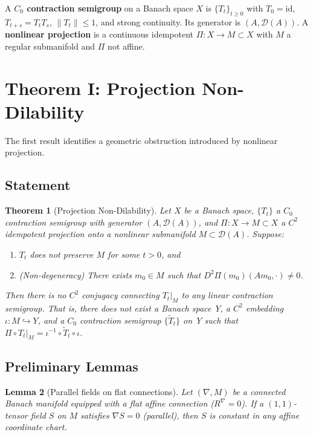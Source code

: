 \documentclass[12pt,a4paper]{amsart}
\theoremstyle{plain}
\newtheorem{theorem}{Theorem}[section]
\newtheorem{lemma}[theorem]{Lemma}
\theoremstyle{definition}
\theoremstyle{remark}
\newcommand{\id}{\mathrm{id}}
\begin{document}
A \textbf{$C_0$ contraction semigroup} on a Banach space $X$ is
$\{T_t\}_{t \geq 0}$ with $T_0 = \id$, $T_{t+s} = T_t T_s$,
$\|T_t\| \leq 1$, and strong continuity. Its generator is
$(A, \mathcal{D}(A))$. A \textbf{nonlinear projection} is a
continuous idempotent $\Pi\colon X \to M \subset X$ with $M$ a regular
submanifold and $\Pi$ not affine.



\section{Theorem I: Projection Non-Dilability}\label{sec:thm1}

The first result identifies a geometric obstruction introduced by
nonlinear projection.

\subsection{Statement}

\begin{theorem}[Projection Non-Dilability]\label{thm:nondilat}
Let $X$ be a Banach space, $\{T_t\}$ a $C_0$ contraction semigroup
with generator $(A, \mathcal{D}(A))$, and
$\Pi\colon X \to M \subset X$ a $C^2$ idempotent projection onto a
nonlinear submanifold $M \subset \mathcal{D}(A)$. Suppose:
\begin{enumerate}[label=(\alph*)]
  \item $T_t$ does not preserve $M$ for some $t > 0$, and
  \item \emph{(Non-degeneracy)} There exists $m_0 \in M$ such that
    $D^2\Pi(m_0)(Am_0, \cdot) \neq 0$.
\end{enumerate}
Then there is no $C^2$ conjugacy connecting $T_t|_M$ to any linear
contraction semigroup. That is, there does not exist a Banach
space~$Y$, a $C^2$ embedding $\iota\colon M \hookrightarrow Y$, and a
$C_0$ contraction semigroup $\{\tilde{T}_t\}$ on~$Y$ such that
$\Pi \circ T_t|_M = \iota^{-1} \circ \tilde{T}_t \circ \iota$.
\end{theorem}

\subsection{Preliminary Lemmas}

\begin{lemma}[Parallel fields on flat connections]\label{lem:parallel}
Let $(\nabla, M)$ be a connected Banach manifold equipped with a flat
affine connection ($R^{\nabla} = 0$). If a $(1,1)$-tensor field $S$
on $M$ satisfies $\nabla S = 0$ (parallel), then $S$ is constant in
any affine coordinate chart.
\end{lemma}
\end{document}
